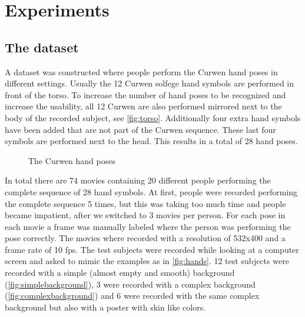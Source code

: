 
\chapter{Experiments}
\label{ch:experiments}


\section{The dataset}
A dataset was constructed where people perform the Curwen hand poses in different settings. Usually the 12 Curwen solfege hand symbols are performed in front of the torso. To increase the number of hand poses to be recognized and increase the usability, all 12 Curwen are also performed mirrored next to the body of the recorded subject, see \autoref{fig:torso}. Additionally four extra hand symbols have been added that are not part of the Curwen sequence. These last four symbols are performed next to the head. This results in a total of 28 hand poses.

\begin{figure}[tb]
  \centering
\hspace{0.03\linewidth}
  \caption{The Curwen hand poses}
  \label{fig:torso}
\end{figure}


In total there are 74 movies containing 20 different people performing the complete sequence of 28 hand symbols. At first, people were recorded performing the complete sequence 5 times, but this was taking too much time and people became impatient, after we switched to 3 movies per person. For each pose in each movie a frame was manually labeled where the person was performing the pose correctly.  The movies where recorded with  a resolution of 532x400 and a frame rate of 10 fps. The test subjects were recorded while looking at a computer screen and asked to mimic the examples as in \autoref{fig:hands}. 12 test subjects were recorded with a simple (almost empty and smooth) background (\autoref{fig:simplebackground}), 3 were recorded with a complex background (\autoref{fig:complexbackground}) and 6 were recorded with the same complex background but also with a poster with skin like colors.

